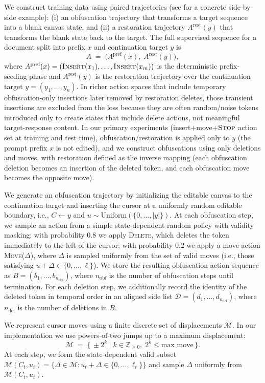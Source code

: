 \documentclass[11pt]{article}
\DeclareRobustCommand{\ph}[1]{#1}
\DeclareRobustCommand{\phA}{A}
\DeclareRobustCommand{\ph}[1]{\ifmmode\text{\phoenicianfont #1}\else{\phoenicianfont #1}\fi}
\DeclareRobustCommand{\phA}{\ph{\char"10900}} %
\DeclareRobustCommand{\ph}[1]{#1}
\DeclareRobustCommand{\phA}{A}
\DeclareRobustCommand{\Stop}{\ifmmode\text{\textsc{Stop}}\else\textsc{Stop}\fi}
\DeclareRobustCommand{\Insert}{\ifmmode\text{\textsc{Insert}}\else\textsc{Insert}\fi}
\newcommand{\Mset}{\mathcal{M}}
\begin{document}
We construct training data using paired trajectories (see  for a concrete side-by-side example):
(i) an obfuscation trajectory that transforms a target sequence into a blank canvas state, and
(ii) a restoration trajectory $\phA^{\text{rest}}(y)$ that transforms the blank state back to the target.
The full supervised sequence for a document split into prefix $x$ and continuation target $y$ is
\[
\phA \;=\; \bigl(\phA^{\text{pref}}(x),\; \phA^{\text{rest}}(y)\bigr),
\]
where $\phA^{\text{pref}}(x) = (\Insert(x_1),\dots,\Insert(x_m))$ is the deterministic prefix-seeding phase and $\phA^{\text{rest}}(y)$ is the restoration trajectory over the continuation target $y=(y_1,\dots,y_n)$. In richer action spaces that include temporary obfuscation-only insertions later removed by restoration deletes, those transient insertions are excluded from the loss because they are often random/noise tokens introduced only to create states that include delete actions, not meaningful target-response content. In our primary experiments (insert+move+$\Stop$ action set at training and test time), obfuscation/restoration is applied only to $y$ (the prompt prefix $x$ is not edited), and we construct obfuscations using only deletions and moves, with restoration defined as the inverse mapping (each obfuscation deletion becomes an insertion of the deleted token, and each obfuscation move becomes the opposite move).

We generate an obfuscation trajectory by initializing the editable canvas to the continuation target and inserting the cursor at a uniformly random editable boundary, i.e., $C \leftarrow y$ and $u \sim \mathrm{Uniform}(\{0,\dots,|y|\})$. At each obfuscation step, we sample an action from a simple state-dependent random policy with validity masking: with probability $0.8$ we apply \textsc{Delete}, which deletes the token immediately to the left of the cursor; with probability $0.2$ we apply a move action \textsc{Move}($\Delta$), where $\Delta$ is sampled uniformly from the set of valid moves (i.e., those satisfying $u+\Delta\in\{0,\dots,\ell\}$). We store the resulting obfuscation action sequence as $B=(b_1,\dots,b_{n_{\text{obf}}})$, where $n_{\text{obf}}$ is the number of obfuscation steps until termination. For each deletion step, we additionally record the identity of the deleted token in temporal order in an aligned side list $\mathcal{D}=(d_1,\dots,d_{n_{\text{del}}})$, where $n_{\text{del}}$ is the number of deletions in $B$.

We represent cursor moves using a finite discrete set of displacements $\Mset$. In our implementation we use powers-of-two jumps up to a maximum displacement:
\[
\Mset \;=\; \{\, \pm 2^k \mid k\in\mathbb{Z}_{\ge 0},\; 2^k \le \text{max\_move}\,\}.
\]
At each step, we form the state-dependent valid subset $\Mset(C_t,u_t) = \{\Delta\in\Mset : u_t+\Delta\in\{0,\dots,\ell_t\}\}$ and sample $\Delta$ uniformly from $\Mset(C_t,u_t)$.
\end{document}
